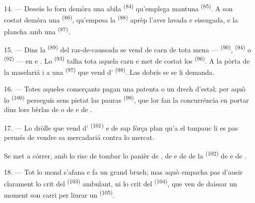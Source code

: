 14. --- Dessús lo forn demòra una abila 
\textsuperscript{(84)} qu'emplega mantuna 
\textsuperscript{(85)}. A son costat demòra una  \textsuperscript{(86)}, qu'empesa la 
\textsuperscript{(88)} aprèp l'aver lavada e eissugada, e la plancha amb una
 \textsuperscript{(87)}.

\VUsaut{4.0mm}
\VUsaut{3.0mm}

15. --- Dins la  \textsuperscript{(89)} del ras-de-caussada se
vend de carn de tota mena ---  \textsuperscript{(90)},
 \textsuperscript{(94)} o  \textsuperscript{(92)} ---
en  e . Lo
 \textsuperscript{(93)} talha tota aquela carn e met de
costat los  \textsuperscript{(96)}. A la pòrta de la
maselariá i a una  \textsuperscript{(97)} que vend d'
\textsuperscript{(98)}. Las dobrís se se li demanda.

16. --- Totes aqueles comerçants pagan una patenta o un drech d'estal; per aquò lo
 \textsuperscript{(100)} perseguís sens pietat las pauras
 \textsuperscript{(99)}, que lor fan la
concurréncia en portar dins lors bèrlas de 
o de  e
de .

\VUsaut{4.0mm}
\VUsaut{3.0mm}

17. --- Lo dròlle que vend d' \textsuperscript{(101)} e de
 sap fòrça plan qu'a el tanpauc li es pas permés de vendre sa
mercadariá contra lo mercat.

Se met a córrer, amb lo risc de tombar lo panièr de , de
 e de  de la 
\textsuperscript{(102)} de  e de .

18. --- Tot lo mond s'afana e fa un grand bruch; mas aquò empacha pas d'ausir
clarament lo crit del  \textsuperscript{(103)} ambulant, ni lo
crit del  \textsuperscript{(104)}, que ven de daissar un moment
son carri per liurar un  \textsuperscript{(105)}.
\VUsaut{6.0mm}
\VUfilet{22mm}
